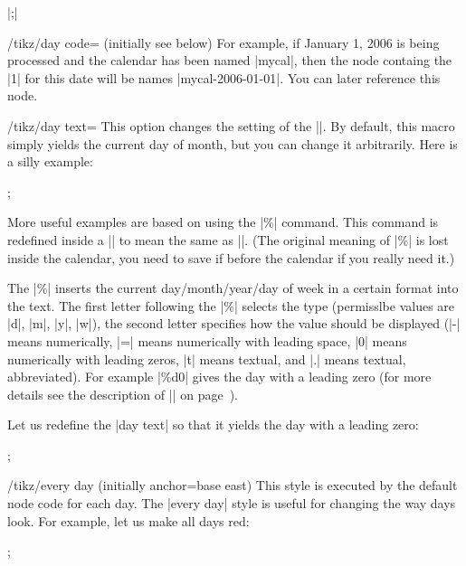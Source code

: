 \begin{command}{\calendar {}|;|}
\begin{key}{/tikz/day code= (initially \normalfont see below)}
    For example, if January 1, 2006 is being processed and the
    calendar has been named |mycal|, then the node containg the |1|
    for this date will be names |mycal-2006-01-01|. You can later
    reference this node.
\begin{codeexample}[]
\end{codeexample}
  \end{key}

  \begin{key}{/tikz/day text=}
    This option changes the setting of the |\tikzdaytext|. By default,
    this macro simply yields the current day of month, but you can
    change it arbitrarily. Here is a silly example:
\begin{codeexample}[]
\tikz \calendar[dates=2000-01-01 to 2000-01-31,week list,
                day text=x];  
\end{codeexample}
    More useful examples are based on using the |\%| command. This
    command is redefined inside a |\pgfcalendar| to mean the same as
    |\pgfcalendarshorthand|. (The original meaning of |\%| is lost
    inside the calendar, you need to save if before the calendar if
    you really need it.)

    The |\%| inserts the current day/month/year/day of week in a
    certain format into the text. The first letter following the |\%|
    selects the type (permisslbe values are |d|, |m|, |y|, |w|), the
    second letter specifies how the value should be displayed (|-|
    means numerically, |=| means numerically with leading
    space, |0| means numerically with leading zeros, |t| means
    textual, and |.| means textual, abbreviated). For example |\%d0|
    gives the day with a leading zero (for more details see
    the description of |\pgfcalendarshorthand| on
    page~\pageref{pgfcalendarshorthand}).

    Let us redefine the |day text| so that it yields the day with a
    leading zero:
\begin{codeexample}
\tikz \calendar[dates=2000-01-01 to 2000-01-31,week list,
                day text=\%d0];  
\end{codeexample}
  \end{key}

  \begin{stylekey}{/tikz/every day (initially anchor=base east)}
    This style is executed by the default node code for each day.
    The |every day| style is useful for changing the way days
    look. For example, let us make all days red:
\begin{codeexample}
\tikz[every day/.style=red]
  \calendar[dates=2000-01-01 to 2000-01-31,week list];
\end{codeexample}
  \end{stylekey}



\end{command}
